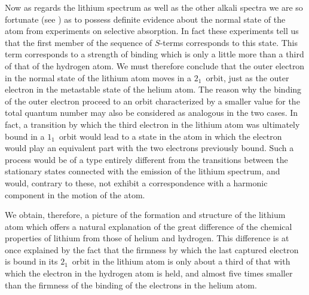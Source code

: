 Now as regards the lithium spectrum as well as the other alkali
spectra we are so fortunate (see ) as to possess definite evidence
about the normal state of the atom from experiments on selective
absorption. In fact these experiments tell us that the first member
of the sequence of $S$-terms corresponds to this state. This term
corresponds to a strength of binding which is only a little more than
a third of that of the hydrogen atom. We must therefore conclude
that the outer electron in the normal state of the lithium atom
moves in a $2_{1}$~orbit, just as the outer electron in the metastable
state of the helium atom. The reason why the binding of the
outer electron  proceed to an orbit characterized by a smaller
value for the total quantum number may also be considered as
analogous in the two cases. In fact, a transition by which the third
electron in the lithium atom was ultimately bound in a $1_{1}$~orbit
would lead to a state in the atom in which the electron would play
an equivalent part with the two electrons previously bound. Such
a process would be of a type entirely different from the transitions
between the stationary states connected with the emission of the
lithium spectrum, and would, contrary to these, not exhibit a
correspondence with a harmonic component in the motion of the
atom.

We obtain, therefore, a picture of the formation and structure of
the lithium atom which offers a natural explanation of the great
difference of the chemical properties of lithium from those of helium
and hydrogen. This difference is at once explained by the fact that
the firmness by which the last captured electron is bound in its
$2_{1}$~orbit in the lithium atom is only about a third of that with which
the electron in the hydrogen atom is held, and almost five times
smaller than the firmness of the binding of the electrons in the
helium atom.

